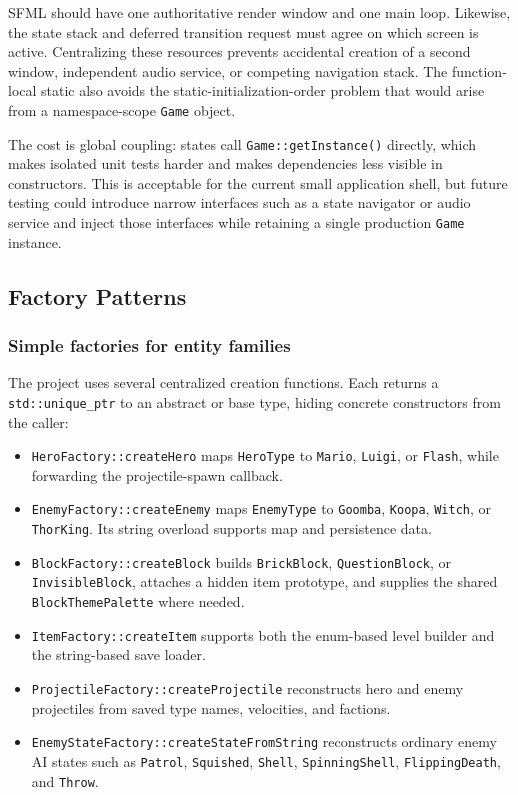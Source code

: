 SFML should have one authoritative render window and one main loop.  Likewise,
the state stack and deferred transition request must agree on which screen is
active.  Centralizing these resources prevents accidental creation of a second
window, independent audio service, or competing navigation stack.  The
function-local static also avoids the static-initialization-order problem that
would arise from a namespace-scope \texttt{Game} object.

The cost is global coupling: states call \texttt{Game::getInstance()} directly,
which makes isolated unit tests harder and makes dependencies less visible in
constructors.  This is acceptable for the current small application shell, but
future testing could introduce narrow interfaces such as a state navigator or
audio service and inject those interfaces while retaining a single production
\texttt{Game} instance.

\subsection{Factory Patterns}
\label{subsec:factory-patterns}

\subsubsection{Simple factories for entity families}

The project uses several centralized creation functions.  Each returns a
\texttt{std::unique\_ptr} to an abstract or base type, hiding concrete
constructors from the caller:

\begin{itemize}
    \item \texttt{HeroFactory::createHero} maps \texttt{HeroType} to
    \texttt{Mario}, \texttt{Luigi}, or \texttt{Flash}, while forwarding the
    projectile-spawn callback.
    \item \texttt{EnemyFactory::createEnemy} maps \texttt{EnemyType} to
    \texttt{Goomba}, \texttt{Koopa}, \texttt{Witch}, or \texttt{ThorKing}.
    Its string overload supports map and persistence data.
    \item \texttt{BlockFactory::createBlock} builds \texttt{BrickBlock},
    \texttt{QuestionBlock}, or \texttt{InvisibleBlock}, attaches a hidden item
    prototype, and supplies the shared \texttt{BlockThemePalette} where needed.
    \item \texttt{ItemFactory::createItem} supports both the enum-based level
    builder and the string-based save loader.
    \item \texttt{ProjectileFactory::createProjectile} reconstructs hero and
    enemy projectiles from saved type names, velocities, and factions.
    \item \texttt{EnemyStateFactory::createStateFromString} reconstructs
    ordinary enemy AI states such as \texttt{Patrol}, \texttt{Squished},
    \texttt{Shell}, \texttt{SpinningShell}, \texttt{FlippingDeath}, and
    \texttt{Throw}.
\end{itemize}

